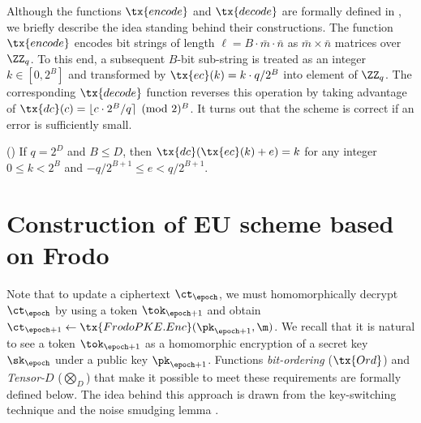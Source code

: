 \documentclass{fundam}
\begin{document}
 \vspace{0.5cm}
Although the functions $\tx{encode}$ and $\tx{decode}$ are formally defined in \cite{Frodo,Frodo2}, we briefly describe the idea standing behind their constructions. The function $\tx{encode}$ encodes bit strings of length $\ell = B\cdot\bar{m}\cdot\bar{n}$ as $\bar{m}\times\bar{n}$ matrices over $\ZZ_{q}$. To this end, a subsequent $B$-bit sub-string is treated as an integer $k\in[0,2^{B}]$ and transformed by $\tx{ec}(k)=k\cdot q/2^{B}$ into element of $\ZZ_{q}$. The corresponding $\tx{decode}$ function reverses this operation by taking advantage of $\tx{dc}(c)=\lfloor c\cdot 2^{B}/q\rceil \pmod 2^{B}$. 
It turns out that the scheme is correct if an error is sufficiently small.
\begin{lemma}(\cite{Frodo})\label{lem::01}
If $q=2^{D}$ and $B\leq D$, then $\tx{dc}(\tx{ec}(k)+e)=k$ for any integer $0\leq k < 2^{B}$ and $-q/2^{B+1}\leq e < q/2^{B+1}$. 	
\end{lemma}	


\section{Construction of  EU scheme based on Frodo}
Note that to update a ciphertext $\ct_{\epoch}$, we must homomorphically decrypt $\ct_{\epoch}$ by using a token $\tok_{\epoch+1}$ and obtain $\ct_{\epoch+1}\gets \tx{FrodoPKE.Enc}(\pk_{\epoch+1}, \m)$.
We recall that it is natural to see a token $\tok_{\epoch+1}$ as a homomorphic encryption of a secret key $\sk_{\epoch}$ under a public key $\pk_{\epoch+1}$. Functions \textit{bit-ordering} ($\tx{Ord}$) and \textit{Tensor-$D$} ($\bigotimes_{D}$) that make it possible to meet these requirements are formally defined below. The idea behind this approach is drawn from the key-switching technique \cite{brakerski2014efficient,brakerski2014leveled,brakerski2011fully} and the noise smudging lemma \cite{asharov2012multiparty, nishimaki2022direction}.
\end{document}
